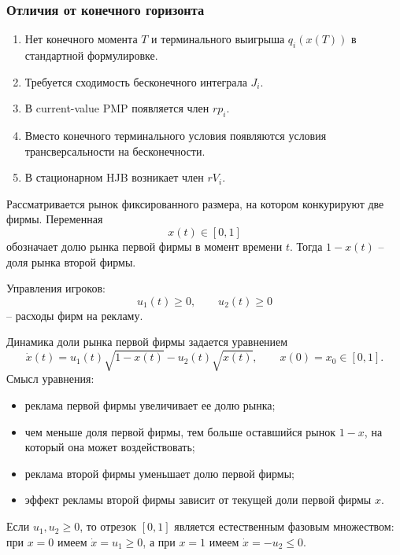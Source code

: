 \documentclass[12pt,a4paper]{article}
\begin{document}
\subsubsection{Отличия от конечного горизонта}

\begin{enumerate}
\item Нет конечного момента $T$ и терминального выигрыша $q_i(x(T))$ в стандартной формулировке.
\item Требуется сходимость бесконечного интеграла $J_i$.
\item В current-value PMP появляется член $r p_i$.
\item Вместо конечного терминального условия появляются условия трансверсальности на бесконечности.
\item В стационарном HJB возникает член $rV_i$.
\end{enumerate}



\newpage
{}




Рассматривается рынок фиксированного размера, на котором конкурируют две фирмы. Переменная
\[
 x(t)\in[0,1]
\]
обозначает долю рынка первой фирмы в момент времени $t$. Тогда $1-x(t)$ -- доля рынка второй фирмы.

Управления игроков:
\[
 u_1(t)\ge0,
 \qquad
 u_2(t)\ge0
\]
-- расходы фирм на рекламу.

Динамика доли рынка первой фирмы задается уравнением
\[
 \dot x(t)=u_1(t)\sqrt{1-x(t)}-u_2(t)\sqrt{x(t)},\qquad x(0)=x_0\in[0,1].
\]
Смысл уравнения:
\begin{itemize}
\item реклама первой фирмы увеличивает ее долю рынка;
\item чем меньше доля первой фирмы, тем больше оставшийся рынок $1-x$, на который она может воздействовать;
\item реклама второй фирмы уменьшает долю первой фирмы;
\item эффект рекламы второй фирмы зависит от текущей доли первой фирмы $x$.
\end{itemize}

Если $u_1,u_2\ge0$, то отрезок $[0,1]$ является естественным фазовым множеством: при $x=0$ имеем $\dot x=u_1\ge0$, а при $x=1$ имеем $\dot x=-u_2\le0$.
\end{document}
